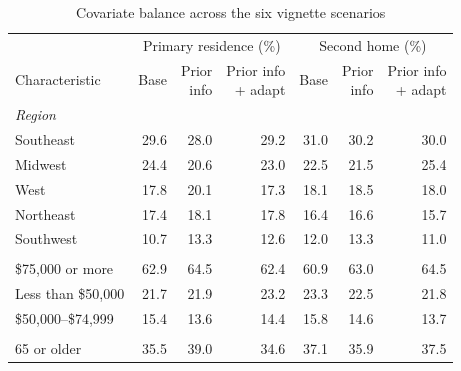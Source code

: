 \begin{table}[H]
\centering
\footnotesize
\setlength{\tabcolsep}{8pt}
\renewcommand{\arraystretch}{1.1}
\begin{threeparttable}
\caption{Covariate balance across the six vignette scenarios}
\label{sitab:balancetable_scen}

\begin{tabular}[t]{lrrrrrr}
\toprule
\multicolumn{1}{c}{ } & \multicolumn{3}{c}{Primary residence (\%)} & \multicolumn{3}{c}{Second home (\%)} \\
\cmidrule(l{3pt}r{3pt}){2-4} \cmidrule(l{3pt}r{3pt}){5-7}
Characteristic & Base & \makecell{Prior\\info} & \makecell{Prior info\\+ adapt} & Base & \makecell{Prior\\info} & \makecell{Prior info\\+ adapt}\\
\midrule
\multicolumn{7}{l}{\textit{Region}}\\
\hspace{1em}Southeast & 29.6 & 28.0 & 29.2 & 31.0 & 30.2 & 30.0\\
\hspace{1em}Midwest & 24.4 & 20.6 & 23.0 & 22.5 & 21.5 & 25.4\\
\hspace{1em}West & 17.8 & 20.1 & 17.3 & 18.1 & 18.5 & 18.0\\
\hspace{1em}Northeast & 17.4 & 18.1 & 17.8 & 16.4 & 16.6 & 15.7\\
\hspace{1em}Southwest & 10.7 & 13.3 & 12.6 & 12.0 & 13.3 & 11.0\\
\addlinespace[0.3em]
\multicolumn{7}{l}{\textit{Household income}}\\
\hspace{1em}\$75{,}000 or more & 62.9 & 64.5 & 62.4 & 60.9 & 63.0 & 64.5\\
\hspace{1em}Less than \$50{,}000 & 21.7 & 21.9 & 23.2 & 23.3 & 22.5 & 21.8\\
\hspace{1em}\$50{,}000--\$74{,}999 & 15.4 & 13.6 & 14.4 & 15.8 & 14.6 & 13.7\\
\addlinespace[0.3em]
\multicolumn{7}{l}{\textit{Age}}\\
\hspace{1em}65 or older & 35.5 & 39.0 & 34.6 & 37.1 & 35.9 & 37.5\\

\end{tabular}
\end{threeparttable}
\end{table}
